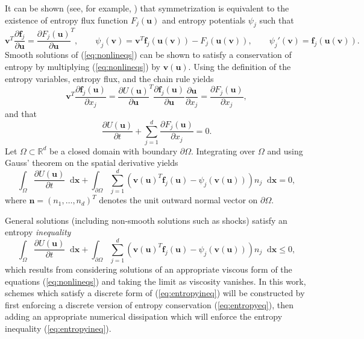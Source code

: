 \documentclass[preprint,10pt]{article}
\theoremstyle{definition}
\theoremstyle{lemma}
\theoremstyle{theorem}
\theoremstyle{assumption}
\newcommand{\pd}[2]{\frac{\partial#1}{\partial#2}}
\newcommand{\LRp}[1]{\left( #1 \right)}
\newcommand{\note}[1]{{\color{blue}{#1}}}
\newcommand{\lcwnote}[1]{{\color{magenta}{#1}}}
\newcommand*\diff[1]{\mathop{}\!{\mathrm{d}#1}} %
\begin{document}
It can be shown (see, for example, \cite{mock1980systems}) that symmetrization is equivalent to the existence of entropy flux function $F_j(\bm{u})$ and entropy potentials $\psi_j$ such that
\[
\bm{v}^T \pd{\bm{f}_j}{\bm{u}} = \pd{F_j(\bm{u})}{\bm{u}}^T, \qquad \psi_j(\bm{v}) = \bm{v}^T\bm{f}_j(\bm{u}(\bm{v})) - F_j(\bm{u}(\bm{v})), \qquad \psi_j'(\bm{v}) = \bm{f}_j(\bm{u}(\bm{v})).
\]
Smooth solutions of (\ref{eq:nonlineqs}) can be shown to satisfy a conservation of entropy by multiplying (\ref{eq:nonlineqs}) by $\bm{v}(\bm{u})$. Using the definition of the entropy variables, entropy flux, and the chain rule yields %
\begin{equation}
\bm{v}^T\pd{\bm{f}_j(\bm{u})}{x_j} = \pd{U(\bm{u})}{\bm{u}}^T\pd{\bm{f}_j(\bm{u})}{\bm{u}}\pd{\bm{u}}{x_j} = \pd{F_j(\bm{u})}{x_j},
\label{eq:chainrule}
\end{equation}
and that
\begin{equation*}
\pd{U(\bm{u})}{t} + \sum_{j=1}^d \pd{F_j(\bm{u})}{x_j} = 0.
\end{equation*}
Let $\Omega \subset \mathbb{R}^d$ be a closed domain with boundary $\partial \Omega$.  Integrating over $\Omega$ and using Gauss' theorem on the spatial derivative yields
\begin{equation}
  \int_{\Omega}\pd{U(\bm{u})}{t}\diff{\bm{x}} + \int_{\partial \Omega} \sum_{j=1}^d \LRp{\bm{v}{(\bm{u})}^T\bm{f}_j(\bm{u}) - \psi_j\LRp{\bm{v}(\bm{u})}}n_j \diff{\bm{x}} = 0,
\label{eq:entropyeq}
\end{equation}
where $\bm{n} = \LRp{n_1,\ldots,n_d}^T$ denotes the unit outward normal vector on $\partial \Omega$.  

General solutions (including non-smooth solutions such as shocks) satisfy an entropy \emph{inequality}
\begin{equation}
  \int_{\Omega}\pd{U(\bm{u})}{t}\diff{\bm{x}} + \int_{\partial \Omega} \sum_{j=1}^d \LRp{\bm{v}{(\bm{u})}^T\bm{f}_j(\bm{u}) - \psi_j\LRp{\bm{v}(\bm{u})}}n_j \diff{\bm{x}} \leq 0,
\label{eq:entropyineq}
\end{equation}
which results from considering solutions of an appropriate viscous form of the equations (\ref{eq:nonlineqs}) and taking the limit as viscosity vanishes.  In this work, schemes which satisfy a discrete form of (\ref{eq:entropyineq}) will be constructed by first enforcing a discrete version of entropy conservation (\ref{eq:entropyeq}), then adding an appropriate numerical dissipation which will enforce the entropy inequality (\ref{eq:entropyineq}).  
\end{document}
